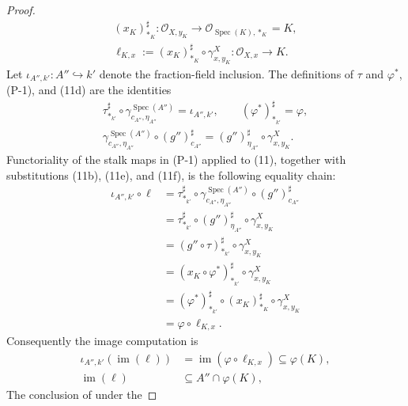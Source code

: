 \begin{proof}
\[\begin{gathered}
    (x_K)_{\ast_K}^\sharp\colon
      \mathcal O_{X,y_K}\longrightarrow
      \mathcal O_{\operatorname{Spec}(K),\ast_K}=K,\\
    \ell_{K,x}:=(x_K)_{\ast_K}^\sharp\circ\gamma^X_{x,y_K}
      \colon\mathcal O_{X,x}\longrightarrow K.
  \end{gathered}                                                   \tag{11e}
  \]
  Let $\iota_{A'',k'}\colon A''\hookrightarrow k'$ denote the fraction-field
  inclusion.  The definitions of $\tau$ and $\varphi^*$, (P-1), and (11d)
  are the identities
  \[
  \begin{gathered}
    \tau_{\ast_{k'}}^\sharp\circ
      \gamma^{\operatorname{Spec}(A'')}_{c_{A''},\eta_{A''}}
       =\iota_{A'',k'},
    \qquad (\varphi^*)_{\ast_{k'}}^\sharp=\varphi,\\
    \gamma^{\operatorname{Spec}(A'')}_{c_{A''},\eta_{A''}}
      \circ (g'')_{c_{A''}}^\sharp
      =(g'')_{\eta_{A''}}^\sharp\circ\gamma^X_{x,y_K}.
  \end{gathered}                                                   \tag{11f}
  \]
  Functoriality of the stalk maps in (P-1) applied to (11), together with
  substitutions (11b), (11e), and (11f), is the following equality chain:
  \[
  \begin{aligned}
    \iota_{A'',k'}\circ\ell
      &=\tau_{\ast_{k'}}^\sharp\circ
        \gamma^{\operatorname{Spec}(A'')}_{c_{A''},\eta_{A''}}
          \circ (g'')_{c_{A''}}^\sharp\\
      &=\tau_{\ast_{k'}}^\sharp\circ (g'')_{\eta_{A''}}^\sharp
          \circ\gamma^X_{x,y_K}\\
      &=(g''\circ\tau)_{\ast_{k'}}^\sharp
          \circ\gamma^X_{x,y_K}\\
      &=(x_K\circ\varphi^*)_{\ast_{k'}}^\sharp
          \circ\gamma^X_{x,y_K}\\
      &=(\varphi^*)_{\ast_{k'}}^\sharp\circ
          (x_K)_{\ast_K}^\sharp\circ\gamma^X_{x,y_K}\\
      &=\varphi\circ\ell_{K,x}.
  \end{aligned}                                                    \tag{11g}
  \]
  Consequently the image computation is
  \[
  \begin{aligned}
    \iota_{A'',k'}(\operatorname{im}(\ell))
      &=\operatorname{im}(\varphi\circ\ell_{K,x})
        \subseteq\varphi(K),\\
    \operatorname{im}(\ell)
      &\subseteq A''\cap\varphi(K),
  \end{aligned}
  \]
  The conclusion of  under the

\end{proof}
